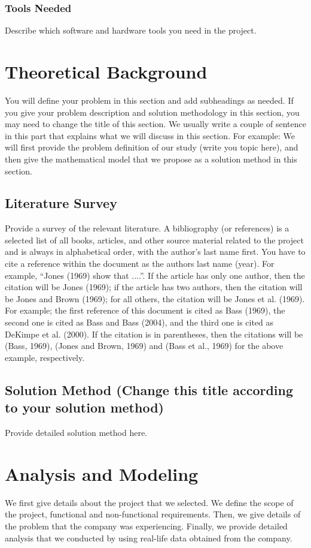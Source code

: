 \documentclass{mefsdp}
\begin{document}
	\subsubsection{Tools Needed}
	Describe which software and hardware tools you need in the project.
	\cite{rothstein2017color}
	
	
	\section{Theoretical Background}
	You will define your problem in this section and add subheadings as needed. If you give your problem description and solution methodology in this section, you may need to change the title of this section. We usually write a couple of sentence in this part that explains what we will discuss in this section. For example: We will first provide the problem definition of our study (write you topic here), and then give the mathematical model that we propose as a solution method in this section.
	
	\subsection{Literature Survey}
	Provide a survey of the relevant literature. A bibliography (or references) is a selected list of all books, articles, and other source material related to the project and is always in alphabetical order, with the author's last name first. You have to cite a reference within the document as the authors last name (year). For example, “Jones (1969) show that ....”. If the article has only one author, then the citation will be Jones (1969); if the article has two authors, then the citation will be Jones and Brown (1969); for all others, the citation will be Jones et al. (1969). For example; the first reference of this document is cited as Bass (1969), the second one is cited as Bass and Bass (2004), and the third one is cited as DeKimpe et al. (2000). If the citation is in parentheses, then the citations will be (Bass, 1969), (Jones and Brown, 1969) and (Bass et al., 1969) for the above example, respectively. 
	\cite{DBLP:journals/corr/VaswaniSPUJGKP17}
	
	\subsection{Solution Method (Change this title according to your solution method)}
	Provide detailed solution method here.
	
	
	\section{Analysis and Modeling}
	We first give details about the project that we selected. We define the scope of the project, functional and non-functional requirements. Then, we give details of the problem that the company was experiencing. Finally, we provide detailed analysis that we conducted by using real-life data obtained from the company. 
	
\end{document}

